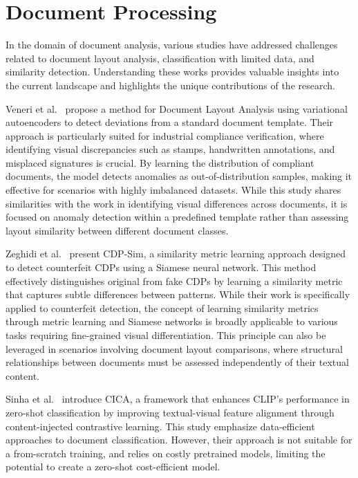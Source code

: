 \section{Document Processing}

In the domain of document analysis, various studies have addressed challenges related to document layout analysis, classification with limited data, and similarity detection. Understanding these works provides valuable insights into the current landscape and highlights the unique contributions of the research.

Veneri et al.~\cite{veneri2022document} propose a method for Document Layout Analysis using variational autoencoders to detect deviations from a standard document template. Their approach is particularly suited for industrial compliance verification, where identifying visual discrepancies such as stamps, handwritten annotations, and misplaced signatures is crucial. By learning the distribution of compliant documents, the model detects anomalies as out-of-distribution samples, making it effective for scenarios with highly imbalanced datasets. While this study shares similarities with the work in identifying visual differences across documents, it is focused on anomaly detection within a predefined template rather than assessing layout similarity between different document classes.%

Zeghidi et al.~\cite{zeghidi2023cdpsim} present CDP-Sim, a similarity metric learning approach designed to detect counterfeit \glspl{CDP} using a Siamese neural network. This method effectively distinguishes original from fake \glspl{CDP} by learning a similarity metric that captures subtle differences between patterns. While their work is specifically applied to counterfeit detection, the concept of learning similarity metrics through metric learning and Siamese networks is broadly applicable to various tasks requiring fine-grained visual differentiation. This principle can also be leveraged in scenarios involving document layout comparisons, where structural relationships between documents must be assessed independently of their textual content.

Sinha et al.~\cite{sinha2024cica} introduce CICA, a framework that enhances CLIP's performance in zero-shot classification by improving textual-visual feature alignment through content-injected contrastive learning. This study emphasize data-efficient approaches to document classification. However, their approach is not suitable for a from-scratch training, and relies on costly pretrained models, limiting the potential to create a zero-shot cost-efficient model.

